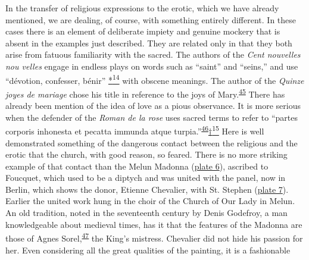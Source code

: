 In the transfer of religious expressions to the erotic, which we have
already mentioned, we are dealing, of course, with something entirely
different. In these cases there is an element of deliberate impiety and
genuine mockery that is absent in the examples just described. They are
related only in that they both arise from fatuous familiarity with the
sacred. The authors of the \emph{Cent nouvelles nou
\protect\hypertarget{13_Chapter_Six__THE_DEPICTION_OF_TH.xhtmlux5cux23page_182}{}{}velles}
engage in endless plays on words such as ``saint'' and ``seins,'' and
use ``dévotion, confesser, bénir''
\protect\hypertarget{13_Chapter_Six__THE_DEPICTION_OF_TH.xhtmlux5cux23id_3015}{\protect\hyperlink{23_NOTES.xhtmlux5cux23id_3016}{*\textsuperscript{14}}}
with obscene meanings. The author of the \emph{Quinze joyes de mariage}
chose his title in reference to the joys of
Mary.\textsuperscript{\protect\hypertarget{13_Chapter_Six__THE_DEPICTION_OF_TH.xhtmlux5cux23id_1181}{\protect\hyperlink{23_NOTES.xhtmlux5cux23id_1182}{45}}}
There has already been mention of the idea of love as a pious
observance. It is more serious when the defender of the \emph{Roman de
la rose} uses sacred terms to refer to ``partes corporis inhonesta et
pecatta immunda atque
turpia.''\textsuperscript{\protect\hypertarget{13_Chapter_Six__THE_DEPICTION_OF_TH.xhtmlux5cux23id_1179}{\protect\hyperlink{23_NOTES.xhtmlux5cux23id_1180}{46}}}\protect\hypertarget{13_Chapter_Six__THE_DEPICTION_OF_TH.xhtmlux5cux23id_3017}{\protect\hyperlink{23_NOTES.xhtmlux5cux23id_3018}{†\textsuperscript{15}}}
Here is well demonstrated something of the dangerous contact between the
religious and the erotic that the church, with good reason, so feared.
There is no more striking example of that contact than the Melun Madonna
(\protect\hyperlink{20_ILLUSTRATIONS_FOLLOW_PAGE.xhtmlux5cux23id_6}{plate
6}), ascribed to Foucquet, which used to be a diptych and was united
with the panel, now in Berlin, which shows the donor, Etienne Chevalier,
with St. Stephen
(\protect\hyperlink{20_ILLUSTRATIONS_FOLLOW_PAGE.xhtmlux5cux23id_7}{plate
7}). Earlier the united work hung in the choir of the Church of Our Lady
in Melun. An old tradition, noted in the seventeenth century by Denis
Godefroy, a man knowledgeable about medieval times, has it that the
features of the Madonna are those of Agnes
Sorel,\textsuperscript{\protect\hypertarget{13_Chapter_Six__THE_DEPICTION_OF_TH.xhtmlux5cux23id_1177}{\protect\hyperlink{23_NOTES.xhtmlux5cux23id_1178}{47}}}
the King's mistress. Chevalier did not hide his passion for her. Even
considering all the great qualities of the painting, it is a fashionable
